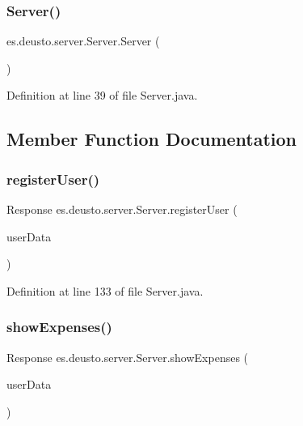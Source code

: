 \subsubsection{\texorpdfstring{Server()}{Server()}}
{\footnotesize\ttfamily es.\+deusto.\+server.\+Server.\+Server (\begin{DoxyParamCaption}{ }\end{DoxyParamCaption})}



Definition at line 39 of file Server.\+java.



\subsection{Member Function Documentation}
\mbox{\label{classes_1_1deusto_1_1server_1_1_server_a12f56d7a970c3c41fefe8ed2db835c0a}} 
\subsubsection{\texorpdfstring{register\+User()}{registerUser()}}
{\footnotesize\ttfamily Response es.\+deusto.\+server.\+Server.\+register\+User (\begin{DoxyParamCaption}\item[{\hyperlink{classes_1_1deusto_1_1serialization_1_1_user_data}{User\+Data}}]{user\+Data }\end{DoxyParamCaption})}



Definition at line 133 of file Server.\+java.

\mbox{\label{classes_1_1deusto_1_1server_1_1_server_aa28b04cc2643cf60072fc2a680288cde}} 
\subsubsection{\texorpdfstring{show\+Expenses()}{showExpenses()}}
{\footnotesize\ttfamily Response es.\+deusto.\+server.\+Server.\+show\+Expenses (\begin{DoxyParamCaption}\item[{\hyperlink{classes_1_1deusto_1_1serialization_1_1_user_data}{User\+Data}}]{user\+Data }\end{DoxyParamCaption})}



